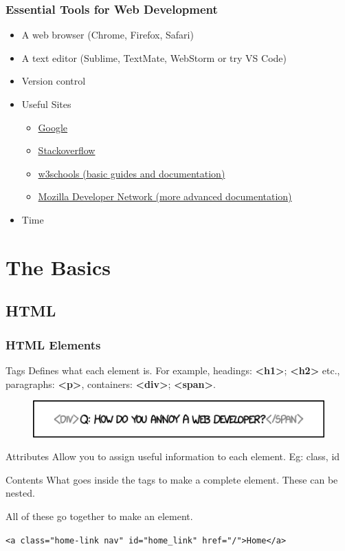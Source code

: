 \documentclass{beamer}
\begin{document}

\begin{frame}
\frametitle{Essential Tools for Web Development}
\begin{itemize}
\item A web browser (Chrome, Firefox, Safari)
\item A text editor (Sublime, TextMate, WebStorm or try VS Code)
\item Version control
\item Useful Sites
\begin{itemize}
	\item \href{http://google.com}{Google}
	\item \href{http://www.stackoverflow.com/}{Stackoverflow}
	\item \href{http://www.w3schools.com}{w3schools (basic guides and documentation)}
	\item \href{https://developer.mozilla.org/en-US/docs/Web}{Mozilla Developer Network (more advanced documentation)}
\end{itemize}
\item Time
\end{itemize}
\end{frame}


\section{The Basics}
\subsection{HTML}

\begin{frame}
\frametitle{HTML Elements}
\begin{block}{Tags}
Defines what each element is. For example, headings: \textbf{<h1>}; \textbf{<h2>} etc., paragraphs: \textbf{<p>}, containers: \textbf{<div>}; \textbf{<span>}.
\begin{figure}
\includegraphics[width=0.8\linewidth]{img/tags.png}
\end{figure}
\end{block}

\begin{block}{Attributes}
Allow you to assign useful information to each element. Eg: class, id
\end{block}

\begin{block}{Contents}
What goes inside the tags to make a complete element. These can be nested.
\end{block}

All of these go together to make an element.

\texttt{<a class="home-link nav" id="home\_link" href="/">Home</a>}

\end{frame}
\end{document}
